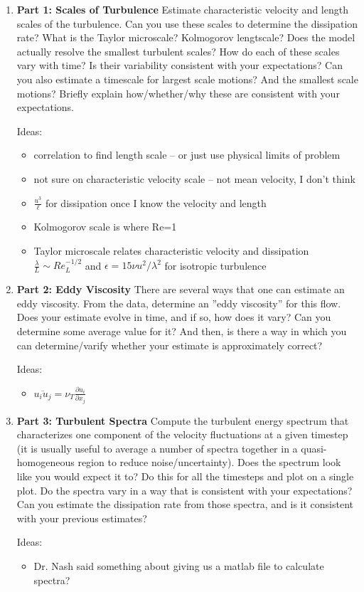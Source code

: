 \documentclass[11pt]{article}
\begin{document}
\begin{enumerate}

    \item \textbf{Part 1: Scales of Turbulence} Estimate characteristic velocity and length scales of the turbulence. Can you use these scales to determine the dissipation rate? What is the Taylor microscale? Kolmogorov lengtscale? Does the model actually resolve the smallest turbulent scales? How do each of these scales vary with time? Is their variability consistent with your expectations? Can you also estimate a timescale for largest scale motions? And the smallest scale motions? Briefly explain how/whether/why these are consistent with your expectations.\par
    
    Ideas:
    \begin{itemize}
        \item correlation to find length scale -- or just use physical limits of problem
        \item not sure on characteristic velocity scale -- not mean velocity, I don't think
        \item $\frac{u^3}{\ell}$ for dissipation once I know the velocity and length
        \item Kolmogorov scale is where Re=1
        \item Taylor microscale relates characteristic velocity and dissipation $\frac{\lambda}{L} \sim Re_L^{-1/2}$ and $\epsilon = 15\nu u^2 / \lambda^2$ for isotropic turbulence
    \end{itemize}
    

    \item \textbf{Part 2: Eddy Viscosity} There are several ways that one can estimate an eddy viscosity. From the data, determine an ''eddy viscosity'' for this flow. Does your estimate evolve in time, and if so, how does it vary? Can you determine some average value for it? And then, is there a way in which you can determine/varify whether your estimate is approximately correct?
    
    Ideas:
    \begin{itemize}
        \item $\overline{u_i u_j} = \nu_T \frac{\partial u_i}{\partial x_j}$
    \end{itemize}
    

    \item \textbf{Part 3: Turbulent Spectra} Compute the turbulent energy spectrum that characterizes one component of the velocity fluctuations at a given timestep (it is usually useful to average a number of spectra together in a quasi-homogeneous region to reduce noise/uncertainty). Does the spectrum look like you would expect it to? Do this for all the timesteps and plot on a single plot. Do the spectra vary in a way that is consistent with your expectations? Can you estimate the dissipation rate from those spectra, and is it consistent with your previous estimates?
    
    Ideas:
    \begin{itemize}
        \item Dr. Nash said something about giving us a matlab file to calculate spectra?
    \end{itemize}



\end{enumerate}
\end{document}
